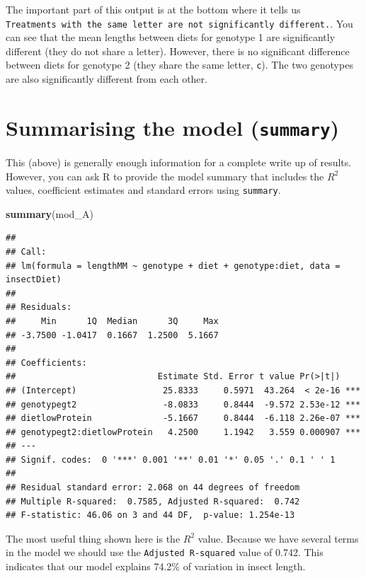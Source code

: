 \documentclass[
  a4paperpaper,
]{book}
\newenvironment{Shaded}{\begin{snugshade}}{\end{snugshade}}
\newcommand{\KeywordTok}[1]{\textcolor[rgb]{0.13,0.29,0.53}{\textbf{#1}}}
\newcommand{\NormalTok}[1]{#1}
\begin{document}
The important part of this output is at the bottom where it tells us \texttt{Treatments\ with\ the\ same\ letter\ are\ not\ significantly\ different.}. You can see that the mean lengths between diets for genotype 1 are significantly different (they do not share a letter). However, there is no significant difference between diets for genotype 2 (they share the same letter, \texttt{c}). The two genotypes are also significantly different from each other.

\hypertarget{summarising-the-model-summary}{%
\section{\texorpdfstring{Summarising the model (\texttt{summary})}{Summarising the model (summary)}}\label{summarising-the-model-summary}}

This (above) is generally enough information for a complete write up of results. However, you can ask R to provide the model summary that includes the \(R^2\) values, coefficient estimates and standard errors using \texttt{summary}.

\begin{Shaded}
\begin{Highlighting}[]
\KeywordTok{summary}\NormalTok{(mod\_A)}
\end{Highlighting}
\end{Shaded}

\begin{verbatim}
## 
## Call:
## lm(formula = lengthMM ~ genotype + diet + genotype:diet, data = insectDiet)
## 
## Residuals:
##     Min      1Q  Median      3Q     Max 
## -3.7500 -1.0417  0.1667  1.2500  5.1667 
## 
## Coefficients:
##                            Estimate Std. Error t value Pr(>|t|)    
## (Intercept)                 25.8333     0.5971  43.264  < 2e-16 ***
## genotypegt2                 -8.0833     0.8444  -9.572 2.53e-12 ***
## dietlowProtein              -5.1667     0.8444  -6.118 2.26e-07 ***
## genotypegt2:dietlowProtein   4.2500     1.1942   3.559 0.000907 ***
## ---
## Signif. codes:  0 '***' 0.001 '**' 0.01 '*' 0.05 '.' 0.1 ' ' 1
## 
## Residual standard error: 2.068 on 44 degrees of freedom
## Multiple R-squared:  0.7585,	Adjusted R-squared:  0.742 
## F-statistic: 46.06 on 3 and 44 DF,  p-value: 1.254e-13
\end{verbatim}

The most useful thing shown here is the \(R^2\) value. Because we have several terms in the model we should use the \texttt{Adjusted\ R-squared} value of 0.742. This indicates that our model explains 74.2\% of variation in insect length.
\end{document}
